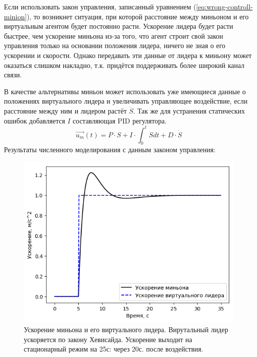 \documentclass[a4paper, 14pt]{extarticle}
\begin{document}
Если использовать закон управления, записанный уравнением (\ref{eq:wrong-controll-minion}), то возникнет ситуация, при которой расстояние между миньоном и его виртуальным агентом будет постоянно расти. Ускорение лидера будет расти быстрее, чем ускорение миньона из-за того, что агент строит свой закон управления только на основании положения лидера, ничего не зная о его ускорении и скорости. Однако передавать эти данные от лидера к миньону может оказаться слишком накладно, т.к. придётся поддерживать более широкий канал связи.
\par
В качестве альтернативы миньон может использовать уже имеющиеся данные о положениях виртуального лидера и увеличивать управляющее воздействие, если расстояние между ним и лидером растёт $\dot{S}$. Так же для устранения статических ошибок добавляется $I$ составляющая PID регулятора.
\begin{equation} \label{eq:right-controll-minion}
\vec{u_{m}}(t) = P \cdot S  + I \cdot \int_0^t{S}dt + D \cdot \dot{S}
\end{equation}
Результаты численного моделирования с данным законом управления:\par
\begin{figure}[!htbp]
	\centering
	\includegraphics[width=0.6\linewidth]{minion/heviside_accelerations}
	\caption{Ускорение миньона и его виртуального лидера. Вирутальный лидер ускоряется по закону Хевисайда. Ускорение выходит на стационарный режим на 25с: через 20с. после воздействия.}
	\label{fig:hevisideaccelerations}
\end{figure}
\end{document}
